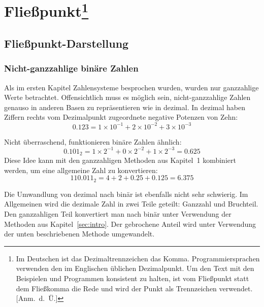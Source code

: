 \chapter[Flie{\ss}punkt]{Flie{\ss}punkt\footnote{Im Deutschen ist das
Dezimaltrennzeichen das Komma. Programmiersprachen verwenden den im
Englischen \"{u}blichen Dezimalpunkt. Um den Text mit den Beispielen und
Programmen konsistent zu halten, ist vom Flie{\ss}punkt statt dem
Flie{\ss}komma die Rede und wird der Punkt als Trennzeichen verwendet.
[Anm.\ d.\ \"{U}\@.]}} 

\section{Flie{\ss}punkt-Darstellung} 

\subsection{Nicht-ganzzahlige bin\"{a}re Zahlen}

Als im ersten Kapitel Zahlensysteme besprochen wurden, wurden nur
ganzzahlige Werte betrachtet. Offensichtlich muss es m\"{o}glich sein,
nicht-ganzzahlige Zahlen genauso in anderen Basen zu repr\"{a}sentieren
wie in dezimal. In dezimal haben Ziffern rechts vom Dezimalpunkt
zugeordnete negative Potenzen von Zehn:
\[ 0.123 = 1 \times 10^{-1} + 2 \times 10^{-2} + 3 \times 10^{-3} \]

Nicht \"{u}berraschend, funktionieren bin\"{a}re Zahlen \"{a}hnlich:
\[ 0.101_2 = 1 \times 2^{-1} + 0 \times 2^{-2} + 1 \times 2^{-3} = 0.625 \]
Diese Idee kann mit den ganzzahligen Methoden aus Kapitel~1
kombiniert werden, um eine allgemeine Zahl zu konvertieren:
\[ 110.011_2 = 4 + 2 + 0.25 + 0.125 = 6.375 \]

Die Umwandlung von dezimal nach bin\"{a}r ist ebenfalls nicht sehr
schwierig. Im Allgemeinen wird die dezimale Zahl in zwei Teile
geteilt: Ganzzahl und Bruchteil. Den ganzzahligen Teil konvertiert
man nach bin\"{a}r unter Verwendung der Methoden aus
Kapitel~\ref{sec:intro}. Der gebrochene Anteil wird unter Verwendung
der unten beschriebenen Methode umgewandelt.


